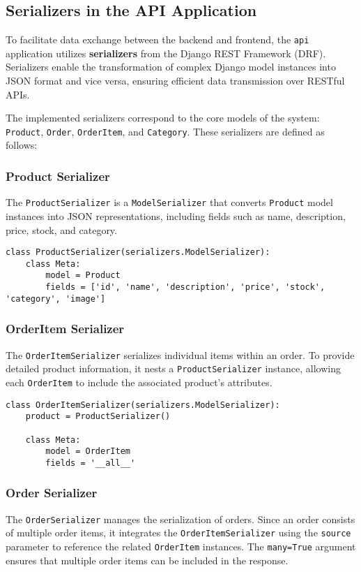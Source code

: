 \subsection{Serializers in the API Application}

To facilitate data exchange between the backend and frontend, the \texttt{api} application utilizes \textbf{serializers} from the Django REST Framework (DRF). Serializers enable the transformation of complex Django model instances into JSON format and vice versa, ensuring efficient data transmission over RESTful APIs.

The implemented serializers correspond to the core models of the system: \texttt{Product}, \texttt{Order}, \texttt{OrderItem}, and \texttt{Category}. These serializers are defined as follows:

\subsubsection{Product Serializer}
The \texttt{ProductSerializer} is a \texttt{ModelSerializer} that converts \texttt{Product} model instances into JSON representations, including fields such as name, description, price, stock, and category.

\begin{verbatim}
class ProductSerializer(serializers.ModelSerializer):
    class Meta:
        model = Product
        fields = ['id', 'name', 'description', 'price', 'stock', 'category', 'image']
\end{verbatim}

\subsubsection{OrderItem Serializer}
The \texttt{OrderItemSerializer} serializes individual items within an order. To provide detailed product information, it nests a \texttt{ProductSerializer} instance, allowing each \texttt{OrderItem} to include the associated product's attributes.

\begin{verbatim}
class OrderItemSerializer(serializers.ModelSerializer):
    product = ProductSerializer()  

    class Meta:
        model = OrderItem
        fields = '__all__'
\end{verbatim}

\subsubsection{Order Serializer}
The \texttt{OrderSerializer} manages the serialization of orders. Since an order consists of multiple order items, it integrates the \texttt{OrderItemSerializer} using the \texttt{source} parameter to reference the related \texttt{OrderItem} instances. The \texttt{many=True} argument ensures that multiple order items can be included in the response.

